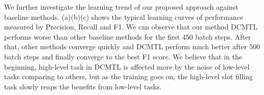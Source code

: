 We further investigate the learning trend of our proposed approach against baseline methods.
(a)(b)(c) shows the typical learning curves of performance measured
by Precision, Recall and F1.
We can observe that our method DCMTL 
performs worse than other baseline methods
for the first $450$ batch steps.
After that, other methods converge quickly 
and DCMTL perform much better after $500$ batch steps
and finally converge to the best F1 score.
We believe that in the beginning,
high-level task in DCMTL is affected more by the noise of low-level tasks comparing to others,
but as the training goes on,
the high-level slot filling task slowly reaps the benefits from low-level tasks.
